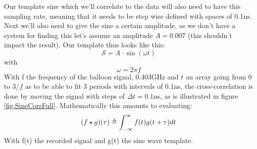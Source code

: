 Our template sine which we'll correlate to the data will also need to have this
sampling rate, meaning that it needs to be step wise defined with spaces of
0.1ns. Next we'll also need to give the sine a certain amplitude, as we don't
have a system for finding this let's assume an amplitude $A =0.007$ 
(this shouldn't impact the result).  Our template thus looks like this:
\begin{equation}
	\mathcal{S} = A\cdot\sin(\omega t) 
\end{equation}
with
\begin{equation}
	\omega = 2\pi f
\end{equation}
With f the frequency of the balloon signal, 0.403GHz and $t$ an array going
from 0 to $3/f$ as to be able to fit 3 periods with intervals of 0.1ns, the
cross-correlation is done by moving the signal with steps of $\Delta t = 0.1$ns,
as is illustrated in figure \ref{fig:SineCorrFull}. Mathematically this
amounts to evaluating\cite{Bracewell1966TheFT}:
\begin{equation}
  (f\star g)(\tau) \delequal \int_{-\infty}^\infty f(t)g(t+\tau)dt
\end{equation}
With f(t) the recorded signal and g(t) the sine wave template.

